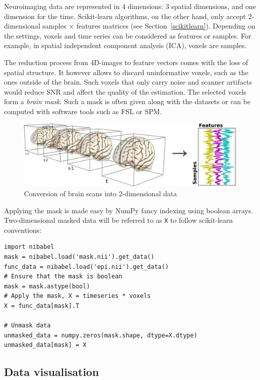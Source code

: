 \documentclass{frontiersSCNS} %
\begin{document}
\label{sec:unmasking}

Neuroimaging data are represented in 4 dimensions: 3 spatial dimensions, and 
one dimension for the time.
Scikit-learn algorithms, on the other hand, only accept 2-dimensional
samples $\times$ features matrices (see Section~\ref{scikitlearn}).
Depending on the settings, voxels and time series can be
considered as features
or samples. For example, in spatial independent component analysis (ICA),
voxels are samples.


The reduction process from 4D-images to feature vectors comes with the loss
of spatial structure. It however allows to discard uninformative
voxels, such as the ones outside of the brain. Such voxels that
only carry noise and scanner artifacts would reduce SNR and affect the
quality of the estimation. The selected voxels form a \emph{brain mask}.
Such a mask is often given along with the datasets or can be computed
with software tools such as FSL or SPM.

\begin{figure}[hbtp]
    \begin{center}
        \includegraphics[width=.5\linewidth]{niimgs.jpg}
    \end{center}
    \caption{Conversion of brain scans into 2-dimensional data}
    \label{fig:niimg}
\end{figure}

Applying the mask is made easy by NumPy fancy indexing using boolean arrays.
Two-dimensional masked data will be referred to as \texttt{X} to follow
scikit-learn conventions:
\begin{lstlisting}
import nibabel
mask = nibabel.load('mask.nii').get_data()
func_data = nibabel.load('epi.nii').get_data()
# Ensure that the mask is boolean
mask = mask.astype(bool)
# Apply the mask, X = timeseries * voxels
X = func_data[mask].T

# Unmask data
unmasked_data = numpy.zeros(mask.shape, dtype=X.dtype)
unmasked_data[mask] = X
\end{lstlisting}

\subsection{Data visualisation}
\end{document}
